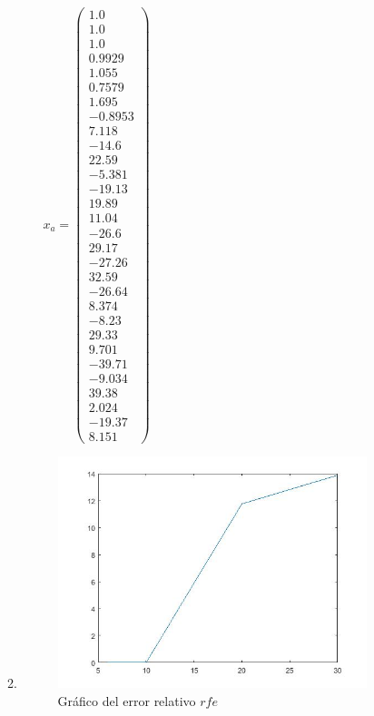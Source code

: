 \documentclass{udpreport}
\begin{document}
\begin{enumerate}
\begin{enumerate}
\begin{itemize}
 				$x_{a} = \left(\begin{array}{c} 1.0\\ 1.0\\ 1.0\\ 0.9929\\ 1.055\\ 0.7579\\ 1.695\\ -0.8953\\ 7.118\\ -14.6\\ 22.59\\ -5.381\\ -19.13\\ 19.89\\ 11.04\\ -26.6\\ 29.17\\ -27.26\\ 32.59\\ -26.64\\ 8.374\\ -8.23\\ 29.33\\ 9.701\\ -39.71\\ -9.034\\ 39.38\\ 2.024\\ -19.37\\ 8.151 \end{array}\right)$
 			\end{itemize}
 			\item 
 			\begin{figure}[H]
 				\centering
 				\includegraphics[width=9cm]{grafo1-rfe}
 				\caption{Gráfico del error relativo $rfe$}	
 			\end{figure}
 			

\end{enumerate}
\end{enumerate}
\end{document}
